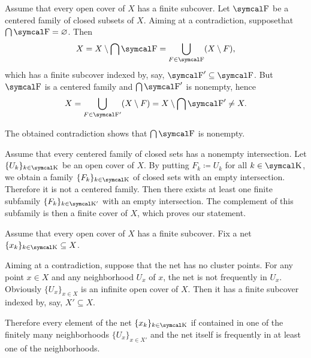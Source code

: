 \begin{RefListProof}
     Assume that every open cover of \( X \) has a finite subcover. Let \( \CF \) be a centered family of closed subsets of \( X \). Aiming at a contradiction, suppose\LEM that \( \bigcap \CF = \varnothing \). Then
    \begin{equation*}
      X
      =
      X \setminus \bigcap \CF
      =
      \bigcup_{F \in \CF} (X \setminus F),
    \end{equation*}
    which has a finite subcover indexed by, say, \( \CF' \subseteq \CF \). But \( \CF \) is a centered family and \( \bigcap \CF' \) is nonempty, hence
    \begin{equation*}
      X
      =
      \bigcup_{F \in \CF'} (X \setminus F)
      =
      X \setminus \bigcap \CF'
      \neq
      X.
    \end{equation*}

    The obtained contradiction shows that \( \bigcap \CF \) is nonempty.

     Assume that every centered family of closed sets has a nonempty intersection. Let \( \{ U_k \}_{k \in \CK} \) be an open cover of \( X \). By putting \( F_k \coloneqq U_k \) for all \( k \in \CK \), we obtain a family \( \{ F_k \}_{k \in \CK} \) of closed sets with an empty intersection. Therefore it is not a centered family. Then there exists at least one finite subfamily \( \{ F_k \}_{k \in \CK'} \) with an empty intersection. The complement of this subfamily is then a finite cover of \( X \), which proves our statement.

     Assume that every open cover of \( X \) has a finite subcover. Fix a net \( \{ x_k \}_{k \in \CK} \subseteq X \).

    Aiming at a contradiction, suppose that the net has no cluster points. For any point \( x \in X \) and any neighborhood \( U_x \) of \( x \), the net is not frequently in \( U_x \). Obviously \( \{ U_x \}_{x \in X} \) is an infinite open cover of \( X \). Then it has a finite subcover indexed by, say, \( X' \subseteq X \).

    Therefore every element of the net \( \{ x_k \}_{k \in \CK} \) if contained in one of the finitely many neighborhoods \( \{ U_x \}_{x \in X'} \) and the net itself is frequently in at least one of the neighborhoods.


\end{RefListProof}
